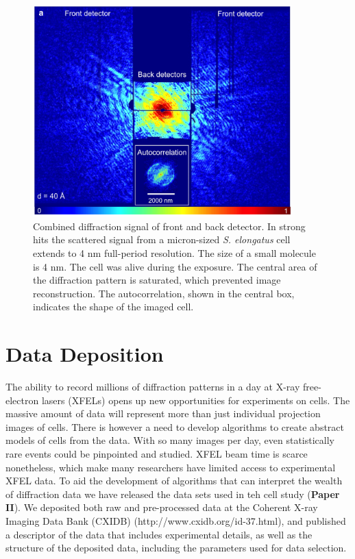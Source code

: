 \begin{figure}[!h]
	\centering 
		\includegraphics[width=100mm]{StrongHit.png}
	\caption{Combined diffraction signal of front and back detector. In strong hits the scattered signal from a micron-sized \textit{S. elongatus} cell extends to 4 nm full-period resolution. The size of a small molecule is 4 nm. The cell was alive during the exposure. The central area of the diffraction pattern is saturated, which prevented image reconstruction. The autocorrelation, shown in the central box, indicates the shape of the imaged cell.}\label{fig:StrongHit}
\end{figure}

\section{Data Deposition}
The ability to record millions of diffraction patterns in a day at X-ray free-electron lasers (XFELs) opens up new opportunities for experiments on cells. The massive amount of data will represent more than just individual projection images of cells. There is however a need to develop algorithms to create abstract models of cells from the data. With so many images per day, even statistically rare events could be pinpointed and studied. XFEL beam time is scarce nonetheless, which make many researchers have limited access to experimental XFEL data. To aid the development of algorithms that can interpret the wealth of diffraction data we have released the data sets used in teh cell study (\textbf{Paper II}). We deposited both raw and pre-processed data at the Coherent X-ray Imaging Data Bank (CXIDB) \cite{Maia2012a} (http://www.cxidb.org/id-37.html), and published a descriptor of the data that includes experimental details, as well as the structure of the deposited data, including the parameters used for data selection.

